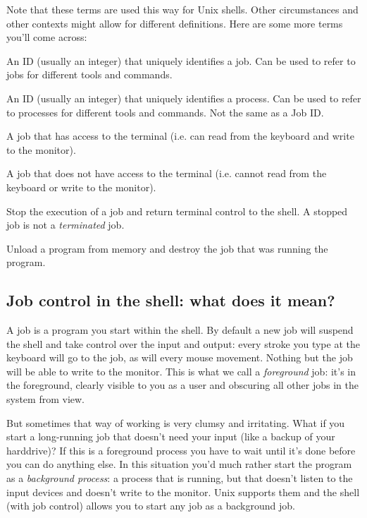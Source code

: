 Note that these terms are used this way for Unix shells. Other circumstances
and other contexts might allow for different definitions. Here are some more
terms you'll come across:

\begin{description}
\setlength{\leftmargin}{0pt}
\setlength{\itemsep}{0pt}
\setlength{\parsep}{0pt}
\setlength{\parskip}{0pt}
\item[Job ID] An ID (usually an integer) that uniquely identifies a job. Can be used to refer to jobs for different tools and commands.
\item[Process ID (or PID)] An ID (usually an integer) that uniquely identifies a process. Can be used to refer to processes for different tools and commands. Not the same as a Job ID.
\item[Foreground job (or foreground ps)] A job that has access to the terminal (i.e. can read from the keyboard and write to the monitor).
\item[Background job (or background ps)] A job that does not have access to the terminal (i.e. cannot read from the keyboard or write to the monitor).
\item[Stop (or suspend)] Stop the execution of a job and return terminal control to the shell. A stopped job is not a \textit{terminated} job.
\item[Terminate] Unload a program from memory and destroy the job that was running the program.
\end{description}

\subsection{Job control in the shell: what does it mean?}
A job is a program you start within the shell. By default a new job will
suspend the shell and take control over the input and output: every stroke you
type at the keyboard will go to the job, as will every mouse movement. Nothing
but the job will be able to write to the monitor. This is what we call a
\textit{foreground} job: it's in the foreground, clearly visible to you as a
user and obscuring all other jobs in the system from view.

But sometimes that way of working is very clumsy and irritating. What if you
start a long-running job that doesn't need your input (like a backup of your
harddrive)? If this is a foreground process you have to wait until it's done
before you can do anything else. In this situation you'd much rather start the
program as a \textit{background process}: a process that is running, but that
doesn't listen to the input devices and doesn't write to the monitor. Unix
supports them and the shell (with job control) allows you to start any job as a
background job.

